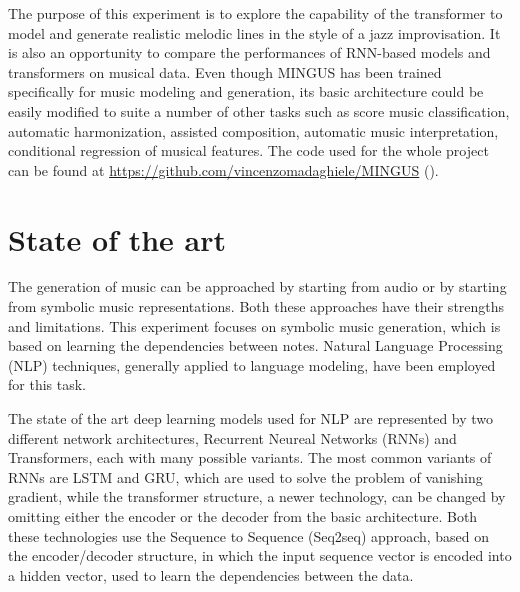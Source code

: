\documentclass{article}
\begin{document}
The purpose of this experiment is to explore the capability of the transformer to model and generate realistic melodic lines in the style of a jazz improvisation. It is also an opportunity to compare the performances of RNN-based models and transformers on musical data. 
Even though MINGUS has been trained specifically for music modeling and generation, its basic architecture could be easily modified to suite a number of other tasks such as score music classification, automatic harmonization, assisted composition, automatic music interpretation, conditional regression of musical features. 
The code used for the whole project can be found at \url{https://github.com/vincenzomadaghiele/MINGUS} (\cite{MINGUScode}).

\newpage

\section{State of the art} \label{sec:state of the art}
The generation of music can be approached by starting from audio or by starting from symbolic music representations. Both these approaches have their strengths and limitations. This experiment focuses on symbolic music generation, which is based on learning the dependencies between notes. Natural Language Processing (NLP) techniques, generally applied to language modeling, have been employed for this task. 

The state of the art deep learning models used for NLP are represented by two different network architectures, Recurrent Neureal Networks (RNNs) and Transformers, each with many possible variants. The most common variants of RNNs are LSTM and GRU, which are used to solve the problem of vanishing gradient, while the transformer structure, a newer technology, can be changed by omitting either the encoder or the decoder from the basic architecture. Both these technologies use the Sequence to Sequence (Seq2seq) approach, based on the encoder/decoder structure, in which the input sequence vector is encoded into a hidden vector, used to learn the dependencies between the data. 
\end{document}
